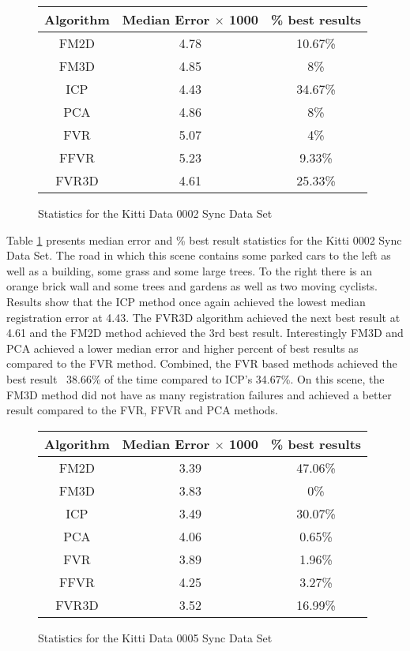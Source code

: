 
\begin{figure}
\centering
\begin{tabular}{ccc}
\hline
\textbf{Algorithm} & \textbf{Median Error $\times$ 1000} & \textbf{\% best results}\\ \hline
FM2D	& 4.78 & 10.67\%\\
FM3D	& 4.85 & 8\%\\
ICP	& 4.43 & 34.67\%\\
PCA	& 4.86 & 8\%\\
FVR	& 5.07 & 4\%\\
FFVR	& 5.23 & 9.33\%\\
FVR3D	& 4.61 & 25.33\%\\
\end{tabular}
\caption{Statistics for the Kitti Data 0002 Sync Data Set}
\label{tab:kittidata0002sync}
\end{figure} 


Table \ref{tab:kittidata0002sync} presents median error and \% best result statistics for the Kitti 0002 Sync Data Set. The road in which this scene contains some parked cars to the left as well as a building, some grass and some large trees. To the right there is an orange brick wall and some trees and gardens as well as two moving cyclists. Results show that the ICP method once again achieved the lowest median registration error at 4.43. The FVR3D algorithm achieved the next best result at 4.61 and the FM2D method achieved the 3rd best result. Interestingly FM3D and PCA achieved a lower median error and higher percent of best results as compared to the FVR method. Combined, the FVR based methods achieved the best result ~38.66\% of the time compared to ICP's 34.67\%. On this scene, the FM3D method did not have as many registration failures and achieved a better result compared to the FVR, FFVR and PCA methods. 




\begin{figure}
\centering
\begin{tabular}{ccc}
\hline
\textbf{Algorithm} & \textbf{Median Error $\times$ 1000} & \textbf{\% best results}\\ \hline
FM2D	& 3.39 & 47.06\%\\
FM3D	& 3.83 & 0\%\\
ICP	& 3.49 & 30.07\%\\
PCA	& 4.06 & 0.65\%\\
FVR	& 3.89 & 1.96\%\\
FFVR	& 4.25 & 3.27\%\\
FVR3D	& 3.52 & 16.99\%\\
\end{tabular}
\caption{Statistics for the Kitti Data 0005 Sync Data Set}
\label{tab:kittidata0005sync}
\end{figure} 

